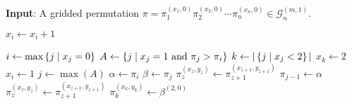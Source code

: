\begin{algorithmic}[H]
\State \textbf{Input}: A gridded permutation $\pi = \pi_1^{(x_1,0)}\pi_2^{(x_2,0)} \cdots \pi_n^{(x_n,0)} \in \mathcal{G}^{(m,1)}_n$.
        \State {}
    \EndIf
    
        \State $x_i \gets x_i + 1$
    \EndFor
    
        \State $i \gets \max\left\{j \mid x_j = 0\right\}$
        \State $A \gets \left\{j \mid x_j = 1 \text{ and } \pi_j > \pi_i\right\}$
        \State $k \gets |\left\{j \mid x_j < 2\right\}|$
            \State $x_k \gets 2$
            \State $x_i \gets 1$
        \Else
            \State $j \gets \max(A)$
            \State $\alpha \gets \pi_i$
            \State $\beta \gets \pi_j$
                \State $\pi_{z}^{(x_z,y_z)} \gets \pi_{z+1}^{(x_{z+1},y_{z+1})}$
            \EndFor
            \State $\pi_{j-1} \gets \alpha$
                \State $\pi_{z}^{(x_z,y_z)} \gets \pi_{z+1}^{(x_{z+1},y_{z+1})}$
            \EndFor
            \State $\pi_{k}^{(x_k,y_k)} \gets \beta^{(2,0)}$
        \EndIf
    \EndWhile
    \State {}
\EndProcedure
\end{algorithmic}